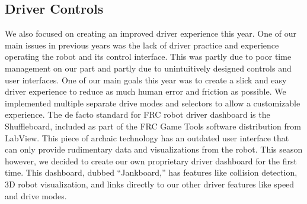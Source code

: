 \subsection{Driver Controls}

We also focused on creating an improved driver experience this year. One
of our main issues in previous years was the lack of driver practice and
experience operating the robot and its control interface. This was
partly due to poor time management on our part and partly due to
unintuitively designed controls and user interfaces. One of our main
goals this year was to create a slick and easy driver experience to
reduce as much human error and friction as possible. We implemented
multiple separate drive modes and selectors to allow a customizable
experience. The de facto standard for FRC robot driver dashboard is the
Shuffleboard, included as part of the FRC Game Tools software
distribution from LabView. This piece of archaic technology has an
outdated user interface that can only provide rudimentary data and
visualizations from the robot. This season however, we decided to create
our own proprietary driver dashboard for the first time. This dashboard,
dubbed ``Jankboard,'' has features like collision detection, 3D robot
visualization, and links directly to our other driver features like
speed and drive modes.